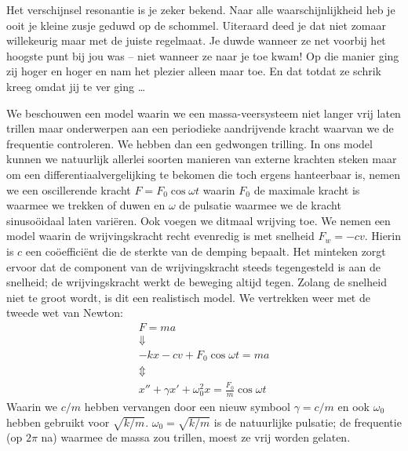 \documentclass{ximera}
\begin{document}
	\author{Bart Lambregs}
    \xmsource\xmuitleg




	
	Het verschijnsel resonantie is je zeker bekend. Naar alle waarschijnlijkheid heb je ooit je kleine zusje geduwd op de schommel. Uiteraard deed je dat niet zomaar willekeurig maar met de juiste regelmaat. Je duwde wanneer ze net voorbij het hoogste punt bij jou was -- niet wanneer ze naar je toe kwam! Op die manier ging zij hoger en hoger en nam het plezier alleen maar toe. En dat totdat ze schrik kreeg omdat jij te ver ging \ldots
	
	We beschouwen een model waarin we een massa-veersysteem niet langer vrij laten trillen maar onderwerpen aan een periodieke aandrijvende kracht waarvan we de frequentie controleren. We hebben dan een gedwongen trilling. In ons model kunnen we natuurlijk allerlei soorten manieren van externe krachten steken maar om een differentiaalvergelijking te bekomen die toch ergens hanteerbaar is, nemen we een oscillerende kracht $F=F_0\cos\omega t$ waarin $F_0$ de maximale kracht is waarmee we trekken of duwen en $\omega$ de pulsatie waarmee we de kracht sinusoöidaal laten variëren. Ook voegen we ditmaal wrijving toe. We nemen een model waarin de wrijvingskracht recht evenredig is met snelheid $F_w=-cv$. Hierin is $c$ een coöefficiënt die de sterkte van de demping bepaalt. Het minteken zorgt ervoor dat de component van de wrijvingskracht steeds tegengesteld is aan de snelheid; de wrijvingskracht werkt de beweging altijd tegen. Zolang de snelheid niet te groot wordt, is dit een realistisch model. We vertrekken weer met de tweede wet van Newton:
	\begin{gather}
	F=ma\nonumber\\
	\Downarrow\nonumber\\
	-kx-cv+F_0\cos\omega t=ma\nonumber\\
	\Updownarrow\nonumber\\
	x''+\gamma x'+\omega_0^2x=\frac{F_0}{m}\cos\omega t
	\end{gather}
	Waarin we $c/m$ hebben vervangen door een nieuw symbool $\gamma=c/m$ en ook $\omega_0$ hebben gebruikt voor $\sqrt{k/m}$. $\omega_0=\sqrt{k/m}$ is de natuurlijke pulsatie; de frequentie (op $2\pi$ na) waarmee de massa zou trillen, moest ze vrij worden gelaten.
	
\end{document}
